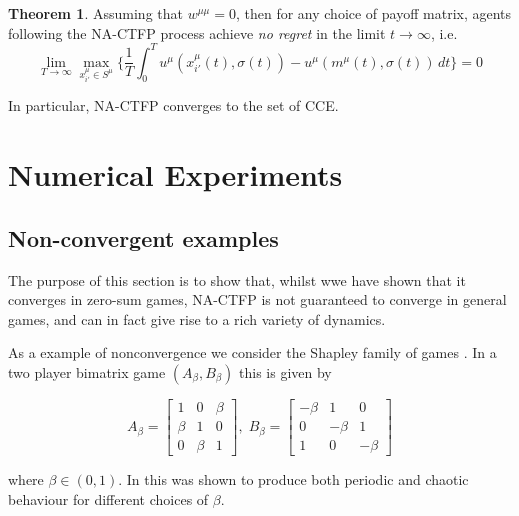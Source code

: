 \documentclass{article}
\theoremstyle{definition}
\newtheorem{theorem}{Theorem}
\begin{document}
  \begin{theorem}
    Assuming that $w^{\mu \mu} = 0$, then for any choice of payoff matrix, agents following the
    NA-CTFP process achieve \emph{no regret} in the limit $t \rightarrow \infty$, i.e.
    \begin{equation}
      \lim_{T \rightarrow \infty} \max_{x_{i'}^\mu \in S^\mu} \Big\{ \frac{1}{T} \int_{0}^{T} u^{\mu}(x_{i'}^\mu(t), \sigma(t)) - u^{\mu}(m^\mu(t), \sigma(t)) \, dt \Big\} = 0
    \end{equation}

    In particular, NA-CTFP converges to the set of CCE.

  \end{theorem}
  

\section{Numerical Experiments}

  \subsection{Non-convergent examples} \label{sec::NonConv}
  The purpose of this section is to show that, whilst wwe have shown that it converges in zero-sum games, NA-CTFP is not guaranteed to converge in general games, and can in fact give rise to a rich variety of dynamics.

  
  
  As a example of nonconvergence we consider the Shapley family of games \cite{}. In a two player bimatrix game $(A_\beta, B_\beta)$ this is given by

  \begin{equation}
    A_\beta = \begin{bmatrix}
      1 & 0 & \beta \\
      \beta & 1 & 0 \\
      0 & \beta & 1
    \end{bmatrix}, \; B_\beta =  \begin{bmatrix}
      - \beta & 1 & 0 \\
      0 & -\beta & 1 \\
      1 & 0 & -\beta
    \end{bmatrix}
  \end{equation}

  where $\beta \in (0, 1)$. In \cite{} this was shown to produce both periodic and chaotic behaviour for different choices of $\beta$. 
\end{document}
